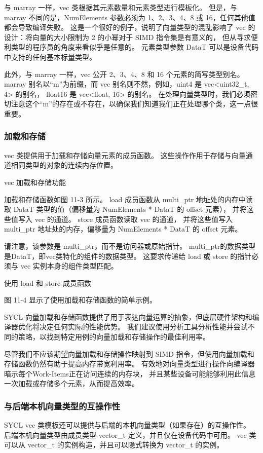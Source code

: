与 marray 一样，vec 类根据其元素数量和元素类型进行模板化。 
但是，与 marray 不同的是，NumElements 参数必须为 1、2、3、4、8 或 16，任何其他值都会导致编译失败。 
这是一个很好的例子，说明了向量类型的混乱影响了 vec 的设计：将向量的大小限制为 2 的小幂对于 SIMD 指令集是有意义的，
但从寻求便利类型的程序员的角度来看似乎是任意的。 元素类型参数 DataT 可以是设备代码中支持的任何基本标量类型。

此外，与 marray 一样，vec 公开 2、3、4、8 和 16 个元素的简写类型别名。 
marray 别名以“m”为前缀，而 vec 别名则不然，例如，uint4 是 vec<uint32\_t, 4> 的别名，
float16 是 vec<float, 16> 的别名。 
在处理向量类型时，我们必须密切注意这个“m”的存在或不存在，以确保我们知道我们正在处理哪个类，这一点很重要。

\subsubsection{加载和存储}
vec 类提供用于加载和存储向量元素的成员函数。 这些操作作用于存储与向量通道相同类型的对象的连续内存位置。

{\color{red} vec 加载和存储功能}

加载和存储函数如图 11-3 所示。 
load 成员函数从 multi\_ptr 地址处的内存中读取 DataT 类型的值（偏移量为 NumElements * DataT 的 offset 元素），
并将这些值写入 vec 的通道。 store 成员函数读取 vec 的通道，
并将这些值写入 multi\_ptr 地址处的内存，偏移量为 NumElements * DataT 的 offset 元素。

请注意，该参数是 multi\_ptr，而不是访问器或原始指针。 
multi\_ptr的数据类型是DataT，即vec类特化的组件的数据类型。 
这要求传递给 load 或 store 的指针必须与 vec 实例本身的组件类型匹配。

{\color{red} 使用 load 和 store 成员函数}

图 11-4 显示了使用加载和存储函数的简单示例。

SYCL 向量加载和存储函数提供了用于表达向量运算的抽象，但底层硬件架构和编译器优化将决定任何实际的性能优势。 
我们建议使用分析工具分析性能并尝试不同的策略，以找到特定用例的向量加载和存储操作的最佳利用率。

尽管我们不应该期望向量加载和存储操作映射到 SIMD 指令，但使用向量加载和存储函数仍然有助于提高内存带宽利用率。 
有效地对向量类型进行操作向编译器暗示每个Work-Items正在访问连续的内存块，
并且某些设备可能能够利用此信息一次加载或存储多个元素，从而提高效率。

\subsubsection{与后端本机向量类型的互操作性}
SYCL vec 类模板还可以提供与后端的本机向量类型（如果存在）的互操作性。 
后端本机向量类型由成员类型 vector\_t 定义，并且仅在设备代码中可用。 
vec 类可以从 vector\_t 的实例构造，并且可以隐式转换为 vector\_t 的实例。

